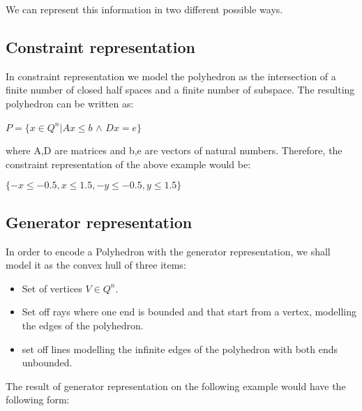 \begin{center}
\end{center}
We can represent this information in two different possible ways.
\subsection{Constraint representation}
In constraint representation we model the polyhedron as the intersection of a finite number of closed half spaces and a finite number of subspace. The resulting polyhedron can be written as:
\begin{center}
	$P=\{x\in Q^n |Ax\leq b$ $\wedge$ $Dx=e\}$
\end{center}
where A,D are matrices and b,e are vectors of natural numbers. Therefore, the constraint representation of the above example would be:
\begin{center}
	$\{-x \leq -0.5,x\leq 1.5 , -y \leq -0.5 ,y\leq 1.5\}$
\end{center}

\subsection{Generator representation}
In order to encode a Polyhedron with the generator representation, we shall model it as the convex hull of three items: 

\begin{itemize}
	\item Set of vertices $V\in Q^n$.
	\item Set off rays where one end is bounded and that start from a vertex, modelling the edges of the polyhedron. 
	\item set off lines modelling the infinite edges of the polyhedron with both ends unbounded.
\end{itemize}
The result of generator representation on the following example would have the following form: 
